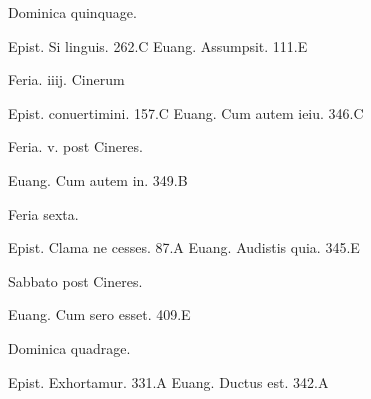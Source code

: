 \documentclass[a5paper,10pt]{book}
\begin{document}
\begin{multicols}{2}
\begin{center}
\color{red} Dominica quinquage.
\end{center}
\vspace{-.75em}
\par \noindent Epist. Si linguis. \hfill 262.C
\newline Euang. Assumpsit. \hfill 111.E
\newline \vspace{-1.75em}
\begin{center}
\color{red} Feria. iiij. Cinerum
\end{center}
\vspace{-.75em}
\par \noindent Epist. conuertimini. \hfill 157.C
\newline Euang. Cum autem ieiu. \hfill 346.C
\newline \vspace{-1.75em}
\begin{center}
\color{red} Feria. v. post Cineres.
\end{center}
\vspace{-.75em}
\par \noindent Euang. Cum autem in. \hfill 349.B
\newline \vspace{-1.75em}
\begin{center}
\color{red} Feria sexta.
\end{center}
\vspace{-.75em}
\par \noindent Epist. Clama ne cesses. \hfill 87.A
\newline Euang. Audistis quia. \hfill 345.E
\newline \vspace{-1.75em}
\begin{center}
\color{red} Sabbato post Cineres.
\end{center}
\vspace{-.75em}
\par \noindent Euang. Cum sero esset. \hfill 409.E
\newline \vspace{-1.75em}
\begin{center}
\color{red} Dominica quadrage.
\end{center}
\vspace{-.75em}
\par \noindent Epist. Exhortamur. \hfill 331.A
\newline Euang. Ductus est. \hfill 342.A
\newline \vspace{-1.75em}

\end{multicols}
\end{document}
